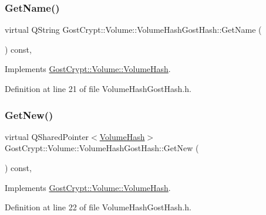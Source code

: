 \subsubsection{\texorpdfstring{Get\+Name()}{GetName()}}
{\footnotesize\ttfamily virtual Q\+String Gost\+Crypt\+::\+Volume\+::\+Volume\+Hash\+Gost\+Hash\+::\+Get\+Name (\begin{DoxyParamCaption}{ }\end{DoxyParamCaption}) const\hspace{0.3cm}{\ttfamily [inline]}, {\ttfamily [virtual]}}



Implements \hyperlink{class_gost_crypt_1_1_volume_1_1_volume_hash_ac6a1fa9550857b211a304c305a526355}{Gost\+Crypt\+::\+Volume\+::\+Volume\+Hash}.



Definition at line 21 of file Volume\+Hash\+Gost\+Hash.\+h.

\mbox{\label{class_gost_crypt_1_1_volume_1_1_volume_hash_gost_hash_aadbaf856de39d537036f536d24fcb8a1}} 
\subsubsection{\texorpdfstring{Get\+New()}{GetNew()}}
{\footnotesize\ttfamily virtual Q\+Shared\+Pointer$<$\hyperlink{class_gost_crypt_1_1_volume_1_1_volume_hash}{Volume\+Hash}$>$ Gost\+Crypt\+::\+Volume\+::\+Volume\+Hash\+Gost\+Hash\+::\+Get\+New (\begin{DoxyParamCaption}{ }\end{DoxyParamCaption}) const\hspace{0.3cm}{\ttfamily [inline]}, {\ttfamily [virtual]}}



Implements \hyperlink{class_gost_crypt_1_1_volume_1_1_volume_hash_a4da6870eedb23e17cf26923478478fa6}{Gost\+Crypt\+::\+Volume\+::\+Volume\+Hash}.



Definition at line 22 of file Volume\+Hash\+Gost\+Hash.\+h.

\mbox{\label{class_gost_crypt_1_1_volume_1_1_volume_hash_gost_hash_a00e9f9090440a18c5a9c75a3bcc9b1a7}} 
